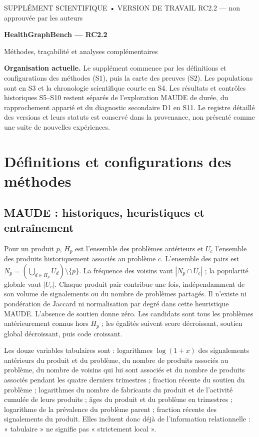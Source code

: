 \documentclass[10pt,a4paper]{article}
\begin{document}
\begin{center}
{\small SUPPLÉMENT SCIENTIFIQUE • VERSION DE TRAVAIL RC2.2 — non approuvée par les auteurs}\par\vspace{7pt}
{\LARGE\bfseries HealthGraphBench — RC2.2}\par\vspace{6pt}
{\large Méthodes, traçabilité et analyses complémentaires}
\end{center}

\textbf{Organisation actuelle.} Le supplément commence par les définitions et configurations des méthodes (S1), puis la carte des preuves (S2). Les populations sont en S3 et la chronologie scientifique courte en S4. Les résultats et contrôles historiques S5--S10 restent séparés de l'exploration MAUDE de durée, du rapprochement apparié et du diagnostic secondaire D1 en S11. Le registre détaillé des versions et leurs statuts est conservé dans la provenance, non présenté comme une suite de nouvelles expériences.

\par{}
\section{Définitions et configurations des méthodes}
\label{supp:methods}
\subsection{MAUDE : historiques, heuristiques et entraînement}
Pour un produit $p$, $H_p$ est l'ensemble des problèmes antérieurs et $U_c$ l'ensemble des produits historiquement associés au problème $c$. L'ensemble des pairs est $N_p=(\bigcup_{d\in H_p}U_d)\setminus\{p\}$. La fréquence des voisins vaut $|N_p\cap U_c|$ ; la popularité globale vaut $|U_c|$. Chaque produit pair contribue une fois, indépendamment de son volume de signalements ou du nombre de problèmes partagés. Il n'existe ni pondération de Jaccard ni normalisation par degré dans cette heuristique MAUDE. L'absence de soutien donne zéro. Les candidats sont tous les problèmes antérieurement connus hors $H_p$ ; les égalités suivent score décroissant, soutien global décroissant, puis code croissant\cite{hgbcode}.

Les douze variables tabulaires sont : logarithmes $\log(1+x)$ des signalements antérieurs du produit et du problème, du nombre de produits associés au problème, du nombre de voisins qui lui sont associés et du nombre de produits associés pendant les quatre derniers trimestres ; fraction récente du soutien du problème ; logarithmes du nombre de fabricants du produit et de l'activité cumulée de leurs produits ; âges du produit et du problème en trimestres ; logarithme de la prévalence du problème parent ; fraction récente des signalements du produit. Elles incluent donc déjà de l'information relationnelle : « tabulaire » ne signifie pas « strictement local ».
\end{document}
